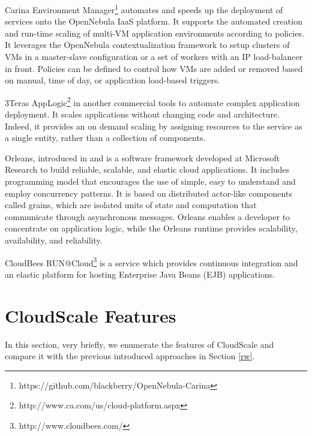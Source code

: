 \documentclass{sig-alternate}
\begin{document}
{Carina Environment Manager\footnote{https://github.com/blackberry/OpenNebula-Carina} automates and speeds up the deployment of services onto the OpenNebula IaaS platform. It supports the automated creation and run-time scaling of multi-VM application environments according to policies. It leverages the OpenNebula contextualization framework to setup clusters of VMs in a master-slave configuration or a set of workers with an IP load-balancer in front. Policies can be defined to control how VMs are added or removed based on manual, time of day, or application load-based triggers.

3Teras AppLogic\footnote{http://www.ca.com/us/cloud-platform.aspx} in another commercial tools to automate complex application deployment. It scales applications without changing code and architecture. Indeed, it provides an on demand scaling by assigning resources to the service as a single entity, rather than a collection of components.

Orleans, introduced in \cite{larus2013look} and \cite{bykov2011orleans} is a software framework developed at Microsoft Research to build reliable, scalable, and elastic cloud applications. It includes programming model that encourages the use of simple, easy to understand and employ concurrency patterns. 
It is based on distributed actor-like components called grains, which are isolated units of state and computation that communicate through asynchronous messages. Orleans enables a developer to concentrate on application logic, while the Orleans runtime provides scalability, availability, and reliability.

CloudBees RUN@Cloud\footnote{http://www.cloudbees.com/} is a service which provides continuous integration and an elastic platform for hosting Enterprise Java Beans (EJB) applications.

\section{CloudScale Features} {\label{cloudScale}
In this section, very briefly, we enumerate the features of CloudScale and compare it with the previous introduced approaches in Section \ref{rw}.

}}
\end{document}
